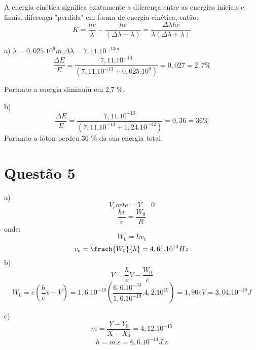 \documentclass{article}
\begin{document}
A energia cinética significa exatamente a diferença entre as energias iniciais e finais, diferença "perdida" em forma de energia cinética, então:
\begin{equation}
    { K =  \frac{hc}{\lambda} - \frac{hc}{(\Delta\lambda + \lambda)} = \frac{\Delta\lambda hc}{\lambda(\Delta\lambda + \lambda)}}
\end{equation}

a) $\lambda = 0,025.10^9m$,$\Delta\lambda = 7,11.10^{-13m}$
\begin{equation}
    {\frac{\Delta E}{E} =  \frac{7,11.10^{-13}}{(7,11.10^{-13}  + 0,025.10^9)} = 0,027 = 2,7 \% }
\end{equation}

Portanto a energia diminuiu em 2,7 \%.

b)
\begin{equation}
    {\frac {\Delta E}{E} = \frac{7,11.10^{-13}}{(7,11.10^{-13}  + 1,24.10^{-12})} = 0,36 = 36 \% }
\end{equation}
Portanto o fóton perdeu 36 \% da sua energia total.

\section {Questão 5}
a) 
\begin{equation}
    {V_corte = V = 0} 
\end{equation}
\begin{equation}
    {\frac{hv}{e} = \frac{W_0}{R}} 
\end{equation}
onde:
\begin{equation}
    {W_0 = h v_c} 
\end{equation}
\begin{equation}
    {v_c = \frach{W_0}{h} = 4,61.10^{14}Hz} 
\end{equation}
b)
\begin{equation}
    {V = \frac{h}{e}V - \frac{W_0}{e}} 
\end{equation}
\begin{equation}
    {W_0 = e(\frac{h}{e}v - V) = 1,6.10^{-19}(\frac{6,6.10^{-34}}{1,6.10^{-19}}.4,2.10^{19}) = 1,90 eV = 3,04 .10^{-19}J} 
\end{equation}

c) 
\begin{equation}
    {m  = \frac{Y-Y_0}{X-X_0} = 4,12.10^{-15}}
\end{equation}
\begin{equation}
    {h  =m.e =   6,6.10^{-14}J.s}
\end{equation}
\begin{figure} 
\end{figure}
\end{document}
